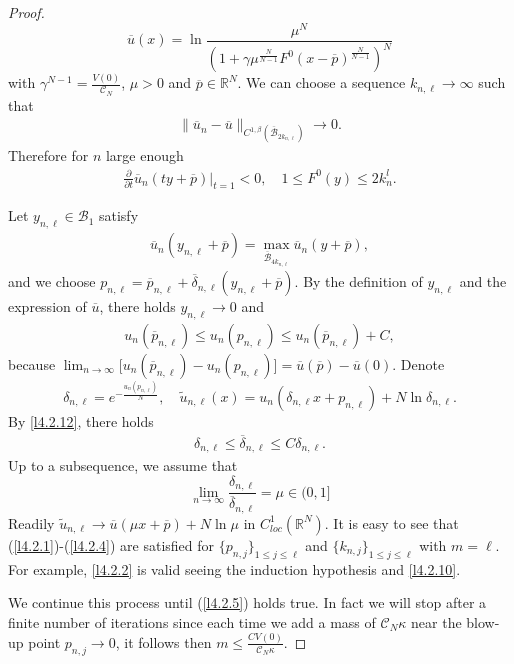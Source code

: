 \documentclass[11pt]{amsart}
\numberwithin{equation}{section}
\newcommand{\R}{\mathbb{R}}
\begin{document}
\begin{proof}
$$\overline{u}(x) =\ln\frac{\mu^{N}}{\left(1+\gamma\mu^{\frac{N}{N-1}}F^{0}(x-\overline{p})^{\frac{N}{N-1}}\right)^{N}}$$
with $\gamma ^{N-1} = \frac{V(0)}{\mathcal{C}_{N}}$, $\mu>0$ and $\overline{p}\in \mathbb{R}^{N}$.
We can choose a sequence $k_{n, \ell}\rightarrow\infty$ such that
\begin{align*}
\|\overline{u}_{n}-\overline{u}\|_{C^{1, \beta}(\overline{\mathcal{B}}_{2k_{n, \ell}})}\rightarrow 0.
\end{align*}
Therefore for $n$ large enough
\begin{align}
\label{l4.2.10}
\frac{\partial}{\partial t}\overline{u}_{n}(ty+\overline{p})|_{t=1}<0, \quad 1 \leq F^{0}(y)\leq 2k_{n}^{l}.
\end{align}

Let $y_{n, \ell}\in \mathcal{B}_1$ satisfy
\begin{align*}
\overline{u}_{n}(y_{n, \ell}+\overline{p})=\max\limits_{\overline{\mathcal{B}}_{4k_{n, \ell}}}\overline{u}_{n}(y+\overline{p}),
\end{align*}
and we choose $p_{n, \ell}=\overline{p}_{n, \ell}+\overline{\delta}_{n, \ell}(y_{n, \ell}+\overline{p})$. By the definition of $y_{n,\ell}$ and the expression of $\overline u$, there holds $y_{n, \ell}\rightarrow0$ and
\begin{align}\label{l4.2.12}
u_{n}(\overline{p}_{n, \ell})\leq u_{n}(p_{n, \ell}) \leq u_{n}(\overline{p}_{n, \ell}) + C,
\end{align}
because $\lim_{n\to\infty}\big[u_{n}(\overline{p}_{n, \ell}) - u_{n}(p_{n, \ell})] = \overline u(\overline p)-\overline u(0)$. Denote
$$\delta_{n, \ell}=e^{-\frac{u_{n}(p_{n, \ell})}{N}}, \quad \widetilde u_{n, \ell}(x) = u_n(\delta_{n, \ell}x + p_{n, \ell}) + N\ln\delta_{n, \ell}.$$
By \eqref{l4.2.12}, there holds
\begin{align*}
\delta_{n, \ell}\leq\overline{\delta}_{n, \ell}\leq C\delta_{n, \ell}.
\end{align*}
Up to a subsequence, we assume that
$$\lim_{n\to\infty} \frac{\delta_{n, \ell}}{\overline \delta_{n, \ell}} = \mu \in (0, 1]$$
Readily $\widetilde u_{n, \ell} \to \overline u(\mu x + \overline p) + N\ln\mu$ in $C^1_{loc}(\R^N)$. It is easy to see that (\ref{l4.2.1})-(\ref{l4.2.4}) are satisfied for $\{p_{n, j}\}_{1\leq j \le \ell}$ and $\{k_{n, j}\}_{1\le j \le \ell}$ with $m= \ell$. For example, \eqref{l4.2.2} is valid seeing the induction hypothesis and \eqref{l4.2.10}.

We continue this process until (\ref{l4.2.5}) holds true. In fact we will stop after a finite number of iterations since each time we add a mass of $\mathcal{C}_N\kappa$ near the blow-up point $p_{n, j} \to 0$, it follows then $m\leq \frac{C V(0)}{\mathcal{C}_N \kappa}$.


\end{proof}
\end{document}
